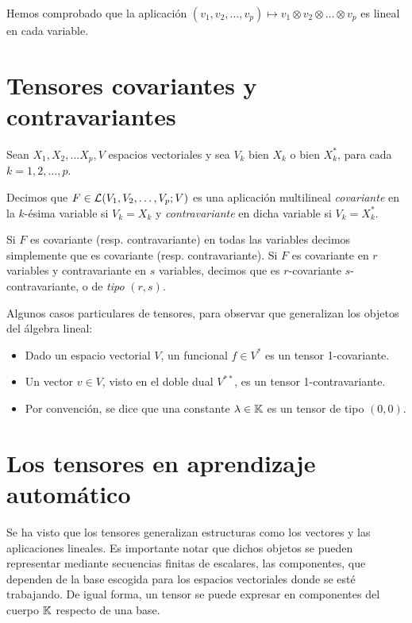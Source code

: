 Hemos comprobado que la aplicación
\((v_1,v_2,\dots,v_p)\mapsto v_1\otimes v_2\otimes\dots\otimes v_p\) es
lineal en cada variable. \reme

\section{Tensores covariantes y
contravariantes}\label{tensores-covariantes-y-contravariantes}

Sean \(X_1,X_2,\dots X_p,V\) espacios vectoriales y sea \(V_k\) bien
\(X_k\) o bien \(X_k^*\), para cada \(k=1,2,\dots,p\).

Decimos que  \(F\in \mathcal{L}(V_1,V_2,\dots,V_p;V)\)
es una aplicación multilineal \emph{covariante} en la \(k\)-ésima variable si \(V_k=X_k\) y
\emph{contravariante} en dicha variable si \(V_k=X_k^*\).

Si \(F\) es covariante (resp. contravariante) en todas las variables
decimos simplemente que es covariante (resp. contravariante). Si \(F\)
es covariante en \(r\) variables y contravariante en \(s\) variables,
decimos que es \(r\)-covariante \(s\)-contravariante, o de \emph{tipo}
\((r, s)\).

\exampleb Algunos casos particulares de tensores, para observar que generalizan los objetos del álgebra lineal:
\begin{itemize}
\item Dado un espacio vectorial \(V\), un funcional \(f\in V^*\) es un
  tensor 1-covariante.
  \item Un vector \(v\in V\), visto en el doble dual
    \(V^{**}\), es un tensor 1-contravariante.
    \item Por convención, se dice que una constante $\lambda\in\mathbb{K}$ es un tensor de tipo \((0,0)\).
\end{itemize}
\examplee

\section{Los tensores en aprendizaje
automático}\label{los-tensores-en-aprendizaje-automuxe1tico}

Se ha visto que los tensores generalizan estructuras como los vectores y las aplicaciones lineales. Es importante notar que dichos objetos se pueden representar mediante secuencias finitas de escalares, las componentes, que dependen de la base escogida para los espacios vectoriales donde se esté trabajando. De igual forma, un tensor se puede expresar en componentes del cuerpo $\mathbb{K}$ respecto de una base.

